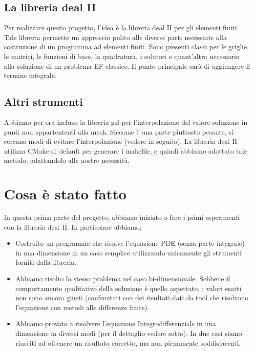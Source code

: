 \documentclass[a4paper,10pt]{article}
\begin{document}
\subsection{La libreria deal II}

Per realizzare questo progetto, l'idea è la libreria deal II per gli elementi finiti. Tale libreria permette un approccio pulito alle diverse parti necessarie alla costruzione di un programma ad elementi finiti. Sono presenti classi per le griglie, le matrici, le funzioni di base, la quadratura, i solutori e quant'altro necessario alla soluzione di un problema EF classico. Il punto principale sarà di aggiungere il termine integrale.

\subsection{Altri strumenti}

Abbiamo per ora incluso la libreria gsl per l'interpolazione del valore soluzione in punti non appartententi alla mesh. Siccome è una parte piuttosto pesante, si cercano modi di evitare l'interpolazione (vedere in seguito). La libreria deal II utilizza CMake di default per generare i makefile, e quindi abbiamo adottato tale metodo, adattandolo alle nostre necessità.

\section{Cosa è stato fatto}

In questa prima parte del progetto, abbiamo iniziato a fare i primi esperimenti con la libreria deal II. In particolare abbiamo:

\begin{itemize}
 \item Costruito un programma che risolve l'equazione PDE  (senza parte integrale) in una dimensione in un caso semplice utilizzando unicamente gli strumenti forniti dalla libreria.
 \item Abbiamo risolto lo stesso problema nel caso bi-dimensionale. Sebbene il comportamento qualitativo della soluzione è quello aspettato, i valori esatti non sono ancora giusti (confrontati con dei risultati dati da tool che risolvono l'equazione con metodi alle differenze finite).
 \item Abbiamo provato a risolvere l'equazione Integrodifferenziale in una dimensione in diversi modi (per il dettaglio vedere sotto). In due casi siamo riusciti ad ottenere un risultato corretto, ma non pienamente soddisfacenti.
\end{itemize}
\end{document}
